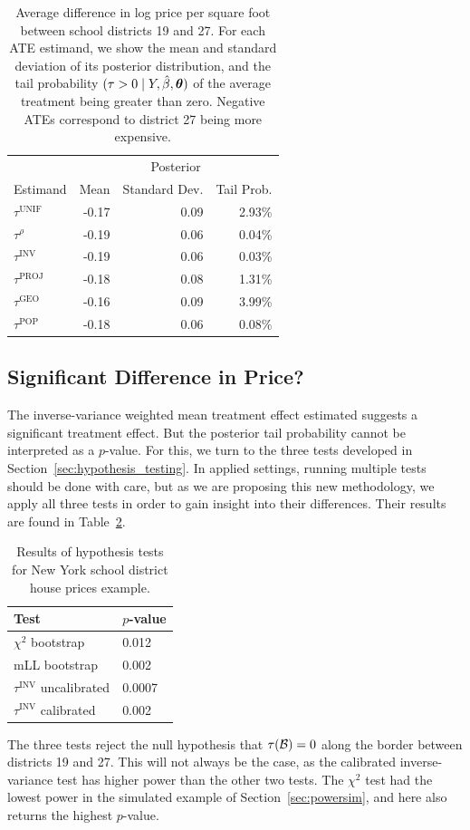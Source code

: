 \documentclass[letter]{article}
\DeclarePairedDelimiter{\parenthesis}{\lparen}{\rparen}
\newcommand{\del}[1]{\parenthesis*{#1}}
\let\Pr\relax
\DeclareMathOperator{\Pr}{\mathbb{P}}
\newcommand{\border}{\mathcal{B}}
\newcommand{\unifavg}{\tau^{\mathrm{UNIF}}}
\newcommand{\invvar}{\tau^{\mathrm{INV}}}
\newcommand{\taurho}{\tau^{\rho}}
\newcommand{\tauproj}{\tau^{\mathrm{PROJ}}}
\newcommand{\taugeo}{\tau^{\mathrm{GEO}}}
\newcommand{\taupop}{\tau^{\mathrm{POP}}}
\newcommand{\hyperparam}{\bm{\theta}}
\begin{document}
\begin{table}
\centering
\begin{tabular}{lrrr}
\hline
& \multicolumn{3}{c}{Posterior} \\
    Estimand & Mean & Standard Dev. & Tail Prob. \\
    \hline
$\unifavg$ & -0.17 & 0.09 & 2.93\% \\
$\taurho$  & -0.19 & 0.06 & 0.04\% \\
$\invvar$  & -0.19 & 0.06 & 0.03\% \\
$\tauproj$ & -0.18 & 0.08 & 1.31\% \\
$\taugeo$  & -0.16 & 0.09 & 3.99\% \\
$\taupop$  & -0.18 & 0.06 & 0.08\% \\
\hline
\end{tabular}
\label{table:NYC_ate}
\caption{Average difference in log price per square foot between school districts 19 and 27. For each ATE estimand, we show the mean and standard deviation of its posterior distribution, and the tail probability $\Pr(\tau > 0 \mid Y, \hat{\beta}, \hyperparam)$ of the average treatment being greater than zero. Negative ATEs correspond to district 27 being more expensive.}
\end{table}
    	\hypertarget{significant-difference-in-price}{%
\subsection{Significant Difference in Price?}\label{significant-difference-in-price}}

The inverse-variance weighted mean treatment effect estimated suggests a significant treatment effect.
But the posterior tail probability cannot be interpreted as a \(p\)-value.
For this, we turn to the three tests developed in Section~\ref{sec:hypothesis_testing}.
In applied settings, running multiple tests should be done with care,
but as we are proposing this new methodology,
we apply all three tests in order to gain insight into their differences.
Their results are found in Table~\ref{table:NYC_tests}.
    

\begin{table}[]
\centering
\label{table:NYC_tests}
\begin{tabular}{ll}
\hline
Test                   & $p$-value \\
\hline
$\chi^2$ bootstrap     & 0.012     \\
mLL bootstrap          & 0.002     \\
$\invvar$ uncalibrated & 0.0007    \\
$\invvar$ calibrated   & 0.002    
\end{tabular}
\caption{Results of hypothesis tests for New York school district house prices example.}
\end{table}
    	The three tests reject the null hypothesis that \(\tau\del{\border}=0\) along the border between districts 19 and 27.
This will not always be the case, as the calibrated inverse-variance test has higher power than the other two tests.
The \(\chi^2\) test had the lowest power in the simulated example of Section~\ref{sec:powersim}, and here also returns the highest \(p\)-value.
    
\end{document}
